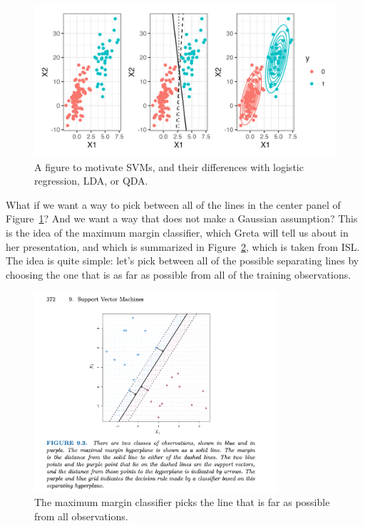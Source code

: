 \begin{figure}
\includegraphics[width=\textwidth]{442_lecs/svm_raw.png}
\caption{A figure to motivate SVMs, and their differences with logistic regression, LDA, or QDA.}
\label{fig_svm}
\end{figure}

What if we want a way to pick between all of the lines in the center panel of Figure~\ref{fig_svm}? And we want a way that does not make a Gaussian assumption?  This is the idea of the maximum margin classifier, which Greta will tell us about in her presentation, and which is summarized in Figure~\ref{fig_svm2}, which is taken from ISL. The idea is quite simple: let's pick between all of the possible separating lines by choosing the one that is as far as possible from all of the training observations. 

\begin{figure}
\includegraphics[width=0.8\textwidth]{442_lecs/svm.png}
\caption{The maximum margin classifier picks the line that is far as possible from all observations.}
\label{fig_svm2}
\end{figure}

